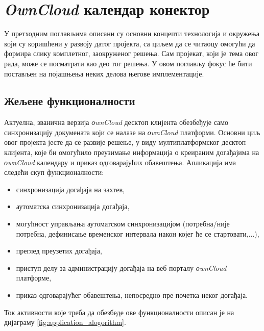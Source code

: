 \chapter{\textit{OwnCloud} календар конектор}
\label{chap:ownCloudCalendarSynchronization}

У претходним поглављима описани су основни концепти технологија и окружења који су коришћени у развоју датог пројекта, са циљем да се читаоцу омогући да формира слику комплетног, заокруженог решења. Сам пројекат, који је тема овог рада, може се посматрати као део тог решења. У овом поглављу фокус ће бити постављен на појашњења неких делова његове имплементације.

\section{Жељене функционалности}

Актуелна, званична верзија \textit{оwnCloud} десктоп клијента обезбеђује само синхронизацију докумената који се налазе на \textit{оwnCloud} платформи. Основни циљ овог пројекта јесте да се развије решење, у виду мултиплатформског десктоп клијента, које би омогућило преузимање информација о креираним догађајима на \textit{оwnCloud} календару и приказ одговарајућих обавештења. Апликација има следећи скуп функционалности:
\begin{itemize}
	\item{синхронизација догађаја на захтев},
	\item{аутоматска синхронизација догађаја},
	\item{могућност управљања аутоматском синхронизацијом (потребна/није потребна, дефинисање временског интервала након којег ће се стартовати,...)},
	\item{преглед преузетих догађаја},
	\item{приступ делу за администрацију догађаја на веб порталу \textit{оwnCloud} платформе},
	\item{приказ одговарајућег обавештења, непосредно пре почетка неког догађаја}.	
\end{itemize}

Ток активности које треба да обезбеде ове функционалности описан је на дијаграму \ref{fig:application_alogorithm}.

